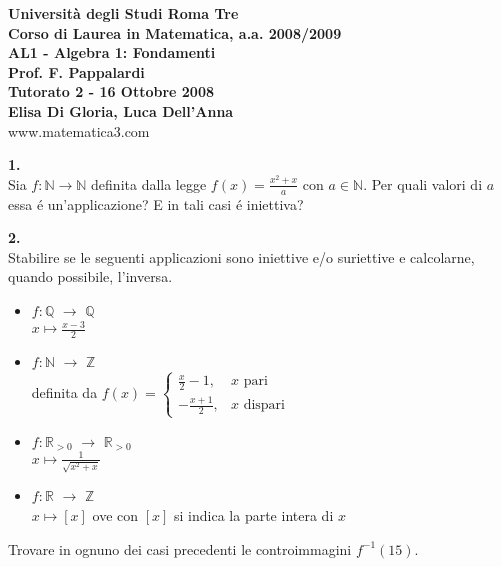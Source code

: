 \documentclass[italian,a4paper,11pt]
{article}
\newcommand{\Q}{\mathbb{Q}}
\newcommand{\Z}{\mathbb Z}
\newcommand{\R}{\mathbb{R}}
\newcommand{\N}{\mathbb{N}}
\newcommand{\frecdl}{\longrightarrow}
\begin{document}
\begin{center}

\textbf{Universit\`a degli Studi Roma Tre}\\

\textbf{Corso di Laurea in Matematica, a.a. 2008/2009}\\

\textbf{AL1 - Algebra 1: Fondamenti}\\

\textbf{Prof. F. Pappalardi}\\

\textbf{Tutorato 2 - 16 Ottobre 2008}\\

\textbf{Elisa Di Gloria, Luca Dell'Anna}\\

www.matematica3.com\\
\end{center}



\vspace{0.5cm}




\noindent
\begin{Ex}\textbf{ 1.}\\
Sia $f: \N \frecdl \N$ definita dalla legge $f(x)=\frac{x^2+x}{a}$ con $a\in \N$. Per quali valori di $a$ essa \'e un'applicazione? E in tali casi \'e iniettiva?
\end{Ex}

\vspace{0.4cm}
\noindent
\begin{Ex}\textbf{ 2.}\\
Stabilire se le seguenti applicazioni sono iniettive e/o suriettive e calcolarne, quando possibile, l'inversa.
\begin{itemize}
	\item $f:\Q$ $\longrightarrow$ $\Q$\\
			$x \longmapsto \frac{x-3}{2}$
	\item $f:\N$ $\longrightarrow$ $\Z$\\ definita da 
	$f(x)=\left\{ \begin{matrix} 
	\frac{x}{2}-1, & x\text{ pari} \\ 
	-\frac{x+1}{2}, & x\text{ dispari}
	\end{matrix}\right.$ 
	\item $f:\R_{>0}$ $\longrightarrow$ $\R_{>0}$\\
			$x \longmapsto \frac{1}{\sqrt{x^2+x}}$
        \item $f:\R$ $\longrightarrow$ $\Z$\\
			$x \longmapsto [x]$	ove con  $[x]$ si indica la parte intera di $x$
\end{itemize}
Trovare in ognuno dei casi precedenti le controimmagini $f^{-1}(15)$.
\end{Ex}
\end{document}
